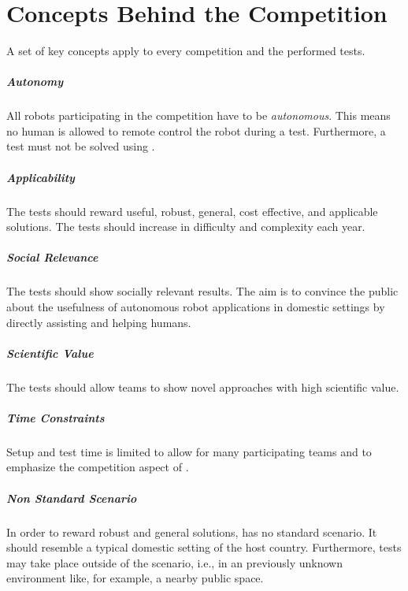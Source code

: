 \chapter{Concepts Behind the Competition}
\label{chap:concepts}
A set of key concepts apply to every \RoboCup\AtHome{} competition and the performed tests.

\paragraph{Autonomy}
\label{sec:concepts:autonomy}
All robots participating in the \RoboCup\AtHome{} competition have to be \emph{autonomous}. This means no human is allowed to remote control the robot during a test. Furthermore, a test must not be solved using \OLC{}.

\paragraph{Applicability}
\label{sec:concepts:applicability}
The tests should reward useful, robust, general, cost effective, and applicable solutions. The tests should increase in difficulty and complexity each year.

\paragraph{Social Relevance}
\label{sec:concepts:socialrelevance}
The tests should show socially relevant results. The aim is to convince the public about the usefulness of autonomous robot applications in domestic settings by directly assisting and helping humans.

\paragraph{Scientific Value}
\label{sec:concepts:scientificvalue}
The tests should allow teams to show novel approaches with high scientific value.

\paragraph{Time Constraints}
\label{sec:concepts:timeconstraints}
Setup and test time is limited to allow for many participating teams and to emphasize the competition aspect of \AtHome{}.

\paragraph{Non Standard Scenario}
\label{sec:concepts:nonstandardscenario}
In order to reward robust and general solutions, \RoboCup\AtHome{} has no standard scenario. It should resemble a typical domestic setting of the host country. Furthermore, tests may take place outside of the scenario, i.e., in an previously unknown environment like, for example, a nearby public space.

